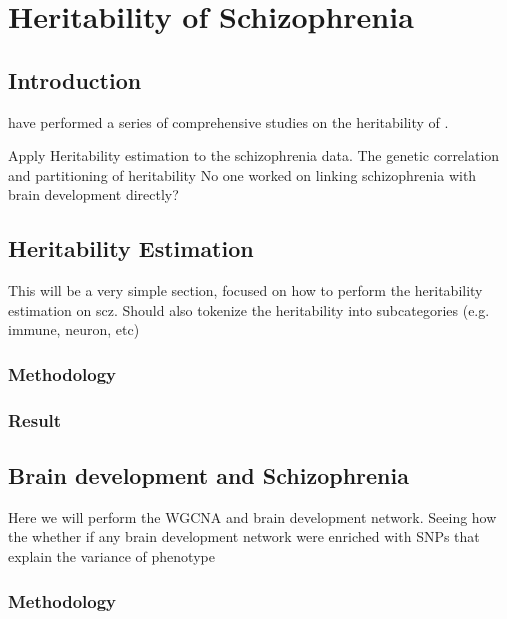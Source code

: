 \chapter{Heritability of Schizophrenia}

\section{Introduction}
\citet{Bulik-Sullivan2015,Finucane2015,Bulik-Sullivan2015a} have performed a series of comprehensive studies on the heritability of .
 
Apply Heritability estimation to the schizophrenia data.
The genetic correlation and partitioning of heritability
No one worked on linking schizophrenia with brain development directly?
\section{Heritability Estimation}
This will be a very simple section, focused on how to perform the heritability estimation on \acrfull{scz}.
Should also tokenize the heritability into subcategories (e.g. immune, neuron, etc)


\subsection{Methodology}
\subsection{Result}
\section{Brain development and Schizophrenia}
Here we will perform the WGCNA and brain development network.
Seeing how the whether if any brain development network were enriched with SNPs that explain the variance of phenotype
\subsection{Methodology}

